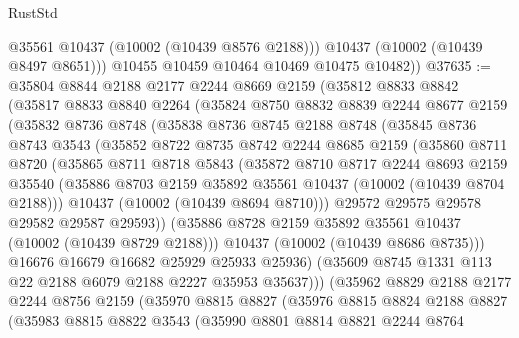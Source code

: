 \begin{lexlean}{RustStd}
\begin{coremodule}
            @35561
            @10437
            (@10002 (@10439 @8576 @2188)))
          @10437
          (@10002 (@10439 @8497 @8651)))
        @10455
        @10459
        @10464
        @10469
        @10475
        @10482))
@37635 := @35804
    @8844
    @2188
    @2177
    @2244
    @8669
    @2159
    (@35812
      @8833
      @8842
      (@35817
        @8833
        @8840
        @2264
        (@35824
          @8750
          @8832
          @8839
          @2244
          @8677
          @2159
          (@35832
            @8736
            @8748
            (@35838
              @8736
              @8745
              @2188
              @8748
              (@35845
                @8736
                @8743
                @3543
                (@35852
                  @8722
                  @8735
                  @8742
                  @2244
                  @8685
                  @2159
                  (@35860
                    @8711
                    @8720
                    (@35865
                      @8711
                      @8718
                      @5843
                      (@35872
                        @8710
                        @8717
                        @2244
                        @8693
                        @2159
                        @35540
                        (@35886 @8703 @2159 @35892 @35561 @10437 (@10002 (@10439 @8704 @2188)))
                        @10437
                        (@10002 (@10439 @8694 @8710)))
                      @29572
                      @29575
                      @29578
                      @29582
                      @29587
                      @29593))
                  (@35886 @8728 @2159 @35892 @35561 @10437 (@10002 (@10439 @8729 @2188)))
                  @10437
                  (@10002 (@10439 @8686 @8735)))
                @16676
                @16679
                @16682
                @25929
                @25933
                @25936)
              (@35609 @8745 @1331 @113 @22 @2188 @6079 @2188 @2227 @35953 @35637)))
          (@35962
            @8829
            @2188
            @2177
            @2244
            @8756
            @2159
            (@35970
              @8815
              @8827
              (@35976
                @8815
                @8824
                @2188
                @8827
                (@35983
                  @8815
                  @8822
                  @3543
                  (@35990
                    @8801
                    @8814
                    @8821
                    @2244
                    @8764

\end{coremodule}
\end{lexlean}

